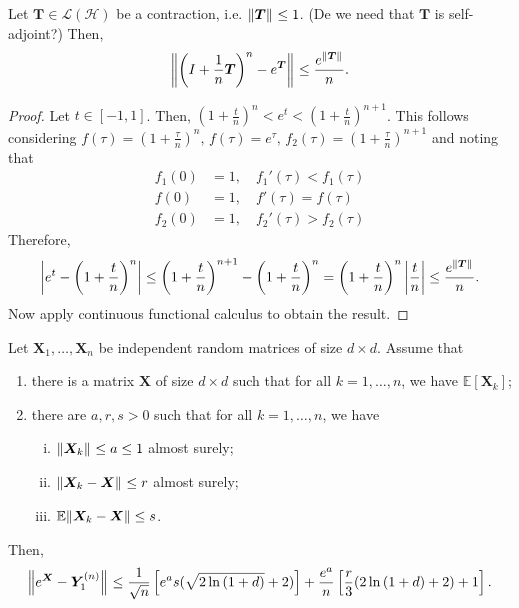 \begin{lem}[]
  \label{expproderror}
    Let \( \bm{T} \in \mathcal{L}(\mathcal{H}) \) be a contraction, i.e. \( \norm{\bm{T}}_{} \leq 1 \). (De we need that \( \bm{T} \) is self-adjoint?) Then, 
    \[ \norm{ \left(I+\frac{1}{n}\bm{T}\right)^{n}- e^{\bm{T}}}_{} \leq \frac{e^{\norm{\bm{T}}_{}}}{n}. \]
\end{lem}

\begin{proof}
  Let \(t \in [-1,1] \). Then, \( \left(1+ \frac{t}{n}\right)^{n} < e^{t} < \left(1+\frac{t}{n}\right)^{n+1} \). This follows considering \( f(\tau)= \left(1+\frac{\tau}{n}\right)^{n},\, f(\tau)=e^{\tau},\, f_2(\tau)=\left(1+\frac{\tau}{n}\right)^{n+1} \) and noting that 
  \begin{align*}
    f_1(0) &=1,\quad f_1'(\tau)< f_1(\tau) \\
    f(0) &=1, \quad f'(\tau) = f(\tau) \\
    f_2(0)&=1, \quad f_2'(\tau)> f_2(\tau)
  \end{align*}
 Therefore, 
 \[ \abs{e^{t}- \left(1+\frac{t}{n}\right)^{n}} \leq \left(1+\frac{t}{n}\right)^{n+1}- \left(1+\frac{t}{n}\right)^{n} = \left(1+\frac{t}{n}\right)^{n} \abs{\frac{t}{n}} \leq \frac{e^{\norm{\bm{T}}_{}}}{n}. \]
 Now apply continuous functional calculus to obtain the result.
\end{proof}


\begin{corl}
    Let \( \bm{X}_1, \dots, \bm{X}_n \) be independent random matrices of size \( d \times d \). Assume that 
    \begin{enumerate}[1)]
      \item there is a matrix \( \bm{X} \) of size \( d \times d \) such that for all \( k=1, \dots, n \), we have \(\mathbb{E}\left[\bm{X}_k\right]\);
      \item there are \( a,r,s >0 \) such that for all \( k=1,\dots, n \), we have 
        \begin{enumerate}[i)]
          \item \( \norm{\bm{X}_k}_{} \leq a \leq 1 \) almost surely;
          \item \( \norm{\bm{X}_k-\bm{X}}_{} \leq r\) almost surely;
          \item \( \mathbb{E}\norm{\bm{X}_k-\bm{X}} \leq s \).
        \end{enumerate}
    \end{enumerate} 
Then, 
\[ \norm{e^{\bm{X}}- \bm{Y}_1^{(n)}}_{} \leq    \frac{1}{\sqrt{n}} \left[e^{a}s (\sqrt{2 \operatorname{ln}\left(1+d\right)}+2)\right] +  \frac{e^{a}}{n} \left[ \frac{r}{3} (2 \operatorname{ln}\left(1+d\right)+2)+ 1 \right] .\]

\end{corl}


